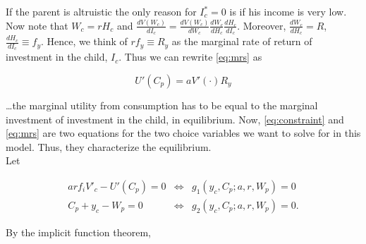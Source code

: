 \noindent If the parent is altruistic the only reason for $I_{c}^* = 0$ is if his income is very low. Now note that $W_{c} = r H_{c}$ and $\frac{d V(W_{c})}{d I_{c}} = \frac{d V(W_{c})}{d W_{c}} \frac{d W_{c}}{d H_{c}} \frac{d H_{c}}{d I_{c}}$. Moreover, $\frac{d W_{c}}{d H_{c}} = R$, $\frac{d H_{c}}{d I_{c}} \equiv f_{y}$. Hence, we think of $r f_{y} \equiv R_{y}$ as the marginal rate of return of investment in the child, $I_{c}$. Thus we can rewrite \eqref{eq:mrs} as

\begin{equation}
U'(C_{p}) = a V'(\cdot) R_{y}
\end{equation}

\noindent \ldots the marginal utility from consumption has to be equal to the marginal investment of investment in the child, in equilibrium. Now, \eqref{eq:constraint} and \eqref{eq:mrs} are two equations for the two choice variables we want to solve for in this model. Thus, they characterize the equilibrium.\\
\indent Let

\begin{eqnarray}
a r f_i V'_{c} - U'(C_p) = 0 &\Leftrightarrow& g_1 (y_c, C_p; a, r, W_p) = 0 \label{eq:g1} \\
C_p + y_c - W_p = 0 &\Leftrightarrow& g_2 (y_c, C_p; a, r, W_p) = 0.  \label{eq:g2} 
\end{eqnarray}

\noindent By the implicit function theorem,

